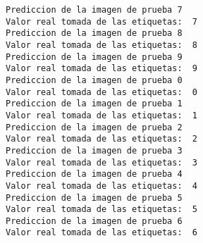 \documentclass[11pt]{article}
\begin{document}
    \begin{Verbatim}[commandchars=\\\{\}]
Prediccion de la imagen de prueba 7
Valor real tomada de las etiquetas:  7
Prediccion de la imagen de prueba 8
Valor real tomada de las etiquetas:  8
Prediccion de la imagen de prueba 9
Valor real tomada de las etiquetas:  9
Prediccion de la imagen de prueba 0
Valor real tomada de las etiquetas:  0
Prediccion de la imagen de prueba 1
Valor real tomada de las etiquetas:  1
Prediccion de la imagen de prueba 2
Valor real tomada de las etiquetas:  2
Prediccion de la imagen de prueba 3
Valor real tomada de las etiquetas:  3
Prediccion de la imagen de prueba 4
Valor real tomada de las etiquetas:  4
Prediccion de la imagen de prueba 5
Valor real tomada de las etiquetas:  5
Prediccion de la imagen de prueba 6
Valor real tomada de las etiquetas:  6
    \end{Verbatim}
\end{document}
